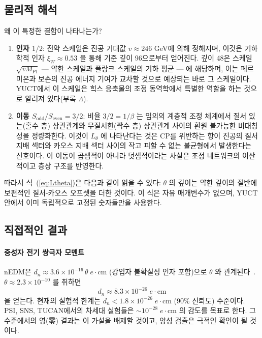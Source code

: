 \documentclass[11pt,a4paper]{article}
\begin{document}
	\subsection{물리적 해석}
	
	왜 이 특정한 결합이 나타나는가?
	\begin{enumerate}
		\item \textbf{인자 \(1/2\)}: 전약 스케일은 진공 기대값 \(v \approx 246\) GeV에 의해 정해지며, 이것은 기하학적 인자 \(\xi_W \approx 0.53\) 을 통해 기준 깊이 96으로부터 얻어진다. 깊이 48은 스케일 \(\sqrt{v M_{\mathrm{Pl}}}\) — 약한 스케일과 플랑크 스케일의 기하 평균 — 에 해당하며, 이는 페르미온과 보손의 진공 에너지 기여가 교차할 것으로 예상되는 바로 그 스케일이다. YUCT에서 이 스케일은 힉스 응축물의 조정 동역학에서 특별한 역할을 하는 것으로 알려져 있다(부록 \(\Lambda\)).
		\item \textbf{이동 \(S_{\mathrm{odd}}/S_{\mathrm{even}} = 3/2\)}: 비율 \(3/2 = 1/\beta\) 는 임의의 계층적 조정 체계에서 질서 있는(홀수 층) 상관관계와 무질서한(짝수 층) 상관관계 사이의 환원 불가능한 비대칭성을 정량화한다. 이것이 \(L_\theta\) 에 나타난다는 것은 CP를 위반하는 항이 진공의 질서 지배 섹터와 카오스 지배 섹터 사이의 작고 피할 수 없는 불균형에서 발생한다는 신호이다. 이 이동이 곱셈적이 아니라 덧셈적이라는 사실은 조정 네트워크의 이산적이고 층상 구조를 반영한다.
	\end{enumerate}
	
	따라서 식~(\ref{eq:Ltheta})은 다음과 같이 읽을 수 있다: \(\theta\) 의 깊이는 약한 깊이의 절반에 보편적인 질서-카오스 오프셋을 더한 것이다. 이 식은 자유 매개변수가 없으며, YUCT 안에서 이미 독립적으로 고정된 숫자들만을 사용한다.
	
	\subsection{직접적인 결과}
	
	\paragraph{중성자 전기 쌍극자 모멘트}
	nEDM은 \(d_n \approx 3.6 \times 10^{-16}\,\theta\; e\!\cdot\!\mathrm{cm}\) (강입자 불확실성 인자 포함)으로 \(\theta\) 와 관계된다~\cite{nEDM2020}. \(\theta \approx 2.3 \times 10^{-10}\) 를 취하면
	\[
	d_n \approx 8.3 \times 10^{-26}\; e\!\cdot\!\mathrm{cm}
	\]
	을 얻는다. 현재의 실험적 한계는 \(d_n < 1.8 \times 10^{-26}\; e\!\cdot\!\mathrm{cm}\) (90\% 신뢰도) 수준이다. PSI, SNS, TUCAN에서의 차세대 실험들은 \(\sim 10^{-28}\; e\!\cdot\!\mathrm{cm}\) 의 감도를 목표로 한다. 그 수준에서의 영(零) 결과는 이 가설을 배제할 것이고, 양성 검출은 극적인 확인이 될 것이다.
	
\end{document}
